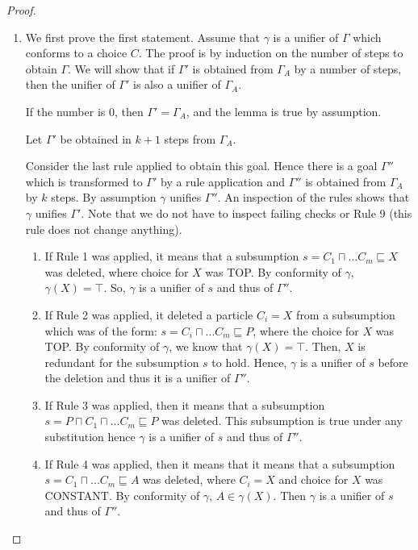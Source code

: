 \documentclass{article}
\begin{document}
\begin{proof}
	\begin{enumerate}
\item 	We first prove the first statement.
	Assume that $\gamma$ is a unifier of $\Gamma$ which conforms to a choice $C$. The proof is by induction on the number of steps to obtain $\Gamma$. We will show that if $\Gamma'$ is obtained from $\Gamma_A$ by a number of steps, then the unifier of $\Gamma'$ is also a unifier of $\Gamma_A$.
	
	If the number is $0$, then $\Gamma'=\Gamma_A$, and the lemma is true by assumption.
	
	Let $\Gamma'$ be obtained in $k+1$ steps from $\Gamma_A$.
	
	Consider the last rule applied to obtain this goal. Hence there is a goal $\Gamma''$ which is 
	transformed to $\Gamma'$ by a rule application and $\Gamma''$ is obtained from $\Gamma_A$ by $k$ steps. By assumption $\gamma$ unifies $\Gamma''$. An inspection of the rules shows that
	$\gamma$ unifies $\Gamma'$. %
	Note that we do not have to inspect failing checks or Rule 9 (this rule does not change anything).
	
	\begin{enumerate}
		\item If Rule 1 was applied, it means that a subsumption $s= C_1 \sqcap ... C_m \sqsubseteq X$ was deleted, where choice for $X$ was TOP. By conformity of $\gamma$, $\gamma(X) = \top$. So, $\gamma$ is a unifier of $s$ and thus of $\Gamma''$.
		
		\item If Rule 2 was applied, it deleted a particle $C_i=X$ from a subsumption which was of the form: $s = C_i \sqcap ... C_m \sqsubseteq P$, where the choice for $X$ was TOP. By conformity of $\gamma$, we know that $\gamma(X) = \top$. Then, $X$ is redundant for the subsumption $s$ to hold. Hence, $\gamma$ is a unifier of $s$ before the deletion and thus it is a unifier of $\Gamma''$.
		
		\item If Rule 3 was applied, then it means that a subsumption $s= P \sqcap C_1 \sqcap ... C_m \sqsubseteq P$ was deleted. This subsumption is true under any substitution hence $\gamma$ is a unifier of $s$ and thus of $\Gamma''$.
		
		
		\item If Rule 4 was applied, then it means that it means that a subsumption $s= C_1 \sqcap ... C_m \sqsubseteq A$ was deleted, where $C_i = X$ and 
		choice for $X$ was CONSTANT. By conformity of $\gamma$, $A \in \gamma(X)$. Then $\gamma$ is a unifier of $s$ and thus of $\Gamma''$.
		

\end{enumerate}
\end{enumerate}
\end{proof}
\end{document}
